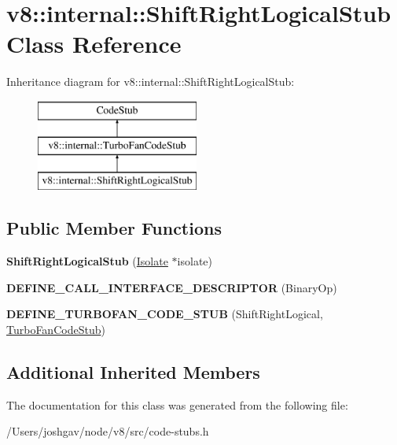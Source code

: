 \hypertarget{classv8_1_1internal_1_1_shift_right_logical_stub}{}\section{v8\+:\+:internal\+:\+:Shift\+Right\+Logical\+Stub Class Reference}
\label{classv8_1_1internal_1_1_shift_right_logical_stub}
Inheritance diagram for v8\+:\+:internal\+:\+:Shift\+Right\+Logical\+Stub\+:\begin{figure}[H]
\begin{center}
\leavevmode
\includegraphics[height=3.000000cm]{classv8_1_1internal_1_1_shift_right_logical_stub}
\end{center}
\end{figure}
\subsection*{Public Member Functions}
\begin{DoxyCompactItemize}
\item 
{\bfseries Shift\+Right\+Logical\+Stub} (\hyperlink{classv8_1_1internal_1_1_isolate}{Isolate} $\ast$isolate)\hypertarget{classv8_1_1internal_1_1_shift_right_logical_stub_a5e5fcc3fbba42aea6330cbb0cbef3365}{}\label{classv8_1_1internal_1_1_shift_right_logical_stub_a5e5fcc3fbba42aea6330cbb0cbef3365}

\item 
{\bfseries D\+E\+F\+I\+N\+E\+\_\+\+C\+A\+L\+L\+\_\+\+I\+N\+T\+E\+R\+F\+A\+C\+E\+\_\+\+D\+E\+S\+C\+R\+I\+P\+T\+OR} (Binary\+Op)\hypertarget{classv8_1_1internal_1_1_shift_right_logical_stub_ae5671f0a7e0cca6dfb857f80d7a80299}{}\label{classv8_1_1internal_1_1_shift_right_logical_stub_ae5671f0a7e0cca6dfb857f80d7a80299}

\item 
{\bfseries D\+E\+F\+I\+N\+E\+\_\+\+T\+U\+R\+B\+O\+F\+A\+N\+\_\+\+C\+O\+D\+E\+\_\+\+S\+T\+UB} (Shift\+Right\+Logical, \hyperlink{classv8_1_1internal_1_1_turbo_fan_code_stub}{Turbo\+Fan\+Code\+Stub})\hypertarget{classv8_1_1internal_1_1_shift_right_logical_stub_a51cf759747455b682983abd3fa52e05a}{}\label{classv8_1_1internal_1_1_shift_right_logical_stub_a51cf759747455b682983abd3fa52e05a}

\end{DoxyCompactItemize}
\subsection*{Additional Inherited Members}


The documentation for this class was generated from the following file\+:\begin{DoxyCompactItemize}
\item 
/\+Users/joshgav/node/v8/src/code-\/stubs.\+h\end{DoxyCompactItemize}
